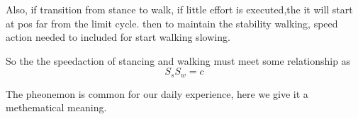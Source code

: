 Also, if transition from stance to walk, if little effort is executed,the it will start at pos far from the limit cycle.
then to maintain the stability walking, speed action needed to included for start walking slowing.

So the the speedaction of stancing and walking must meet some relationship as
\[
S_sS_w=c
\]

The pheonemon is common for our daily experience, here we give it a methematical meaning.






















